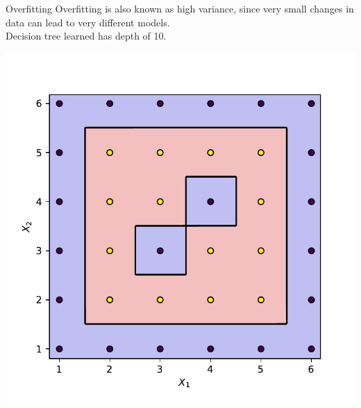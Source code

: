 \documentclass{beamer}
\begin{document}
	\begin{frame}{Overfitting}
	Overfitting is also known as high variance, since very small changes in data can lead to very different models.\\
	Decision tree learned has depth of 10.
	\begin{center}
	\includegraphics[scale=0.5]{example-2-nolimit-boundary}
	\end{center}
	\end{frame}
\end{document}
